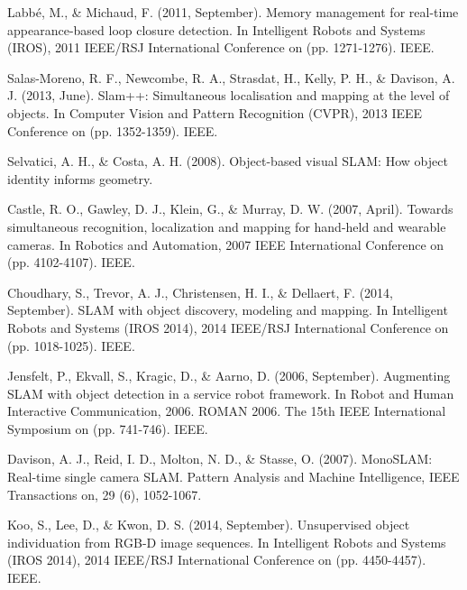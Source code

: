 \documentclass [twoside,hidelinks]{article}
\begin{document}
\begin{thebibliography}{9}

\newblock Labbé, M., \& Michaud, F.  (2011, September). Memory management for real-time appearance-based loop closure detection. In Intelligent Robots and Systems  (IROS), 2011 IEEE/RSJ International Conference on  (pp. 1271-1276). IEEE.


\newblock Salas-Moreno, R. F., Newcombe, R. A., Strasdat, H., Kelly, P. H., \& Davison, A. J.  (2013, June). Slam++: Simultaneous localisation and mapping at the level of objects. In Computer Vision and Pattern Recognition  (CVPR), 2013 IEEE Conference on  (pp. 1352-1359). IEEE.

\newblock Selvatici, A. H., \& Costa, A. H.  (2008). Object-based visual SLAM: How object identity informs geometry.

\newblock Castle, R. O., Gawley, D. J., Klein, G., \& Murray, D. W.  (2007, April). Towards simultaneous recognition, localization and mapping for hand-held and wearable cameras. In Robotics and Automation, 2007 IEEE International Conference on  (pp. 4102-4107). IEEE.


\newblock Choudhary, S., Trevor, A. J., Christensen, H. I., \& Dellaert, F.  (2014, September). SLAM with object discovery, modeling and mapping. In Intelligent Robots and Systems  (IROS 2014), 2014 IEEE/RSJ International Conference on  (pp. 1018-1025). IEEE.

\newblock Jensfelt, P., Ekvall, S., Kragic, D., \& Aarno, D.  (2006, September). Augmenting SLAM with object detection in a service robot framework. In Robot and Human Interactive Communication, 2006. ROMAN 2006. The 15th IEEE International Symposium on  (pp. 741-746). IEEE.

\newblock Davison, A. J., Reid, I. D., Molton, N. D., \& Stasse, O.  (2007). MonoSLAM: Real-time single camera SLAM. Pattern Analysis and Machine Intelligence, IEEE Transactions on, 29 (6), 1052-1067.

\newblock Koo, S., Lee, D., \& Kwon, D. S.  (2014, September). Unsupervised object individuation from RGB-D image sequences. In Intelligent Robots and Systems  (IROS 2014), 2014 IEEE/RSJ International Conference on  (pp. 4450-4457). IEEE.



\end{thebibliography}
\end{document}
